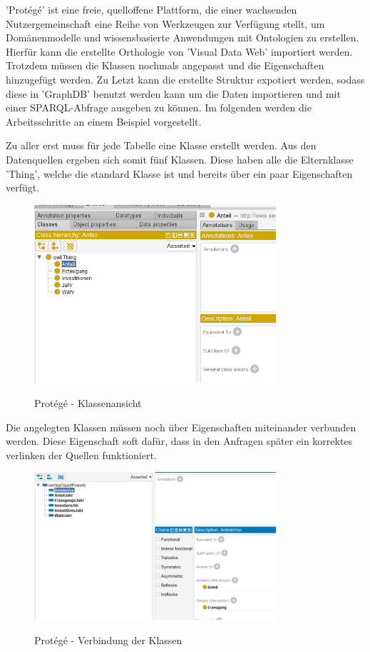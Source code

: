 \documentclass[12pt]{article}
\begin{document}
'Protégé' ist eine freie, quelloffene Plattform, die einer wachsenden Nutzergemeinschaft eine Reihe von Werkzeugen zur Verfügung stellt, um Domänenmodelle und wissensbasierte Anwendungen mit Ontologien zu erstellen. Hierfür kann die erstellte Orthologie von 'Visual Data Web' importiert werden. Trotzdem müssen die Klassen nochmals angepasst und die Eigenschaften hinzugefügt werden. Zu Letzt kann die erstellte Struktur expotiert werden, sodass diese in 'GraphDB' benutzt werden kann um die Daten importieren und mit einer SPARQL-Abfrage ausgeben zu können. Im folgenden werden die Arbeitsschritte an einem Beispiel vorgestellt.

Zu aller erst muss für jede Tabelle eine Klasse erstellt werden. Aus den Datenquellen ergeben sich somit fünf Klassen. Diese haben alle die Elternklasse 'Thing', welche die standard Klasse ist und bereits über ein paar Eigenschaften verfügt. 

\begin{figure}[!ht]
    \caption{Protégé - Klassenansicht}
    \centering
    \includegraphics[width=0.8\textwidth]{images/protege_1.png}
    \label{fig:class}
\end{figure}

Die angelegten Klassen müssen noch über Eigenschaften miteinander verbunden werden. Diese Eigenschaft soft dafür, dass in den Anfragen später ein korrektes verlinken der Quellen funktioniert. 

\begin{figure}[!ht]
    \caption{Protégé - Verbindung der Klassen}
    \centering
    \includegraphics[width=0.8\textwidth]{images/protege_2.png}
    \label{fig:classRelation}
\end{figure}
\end{document}
